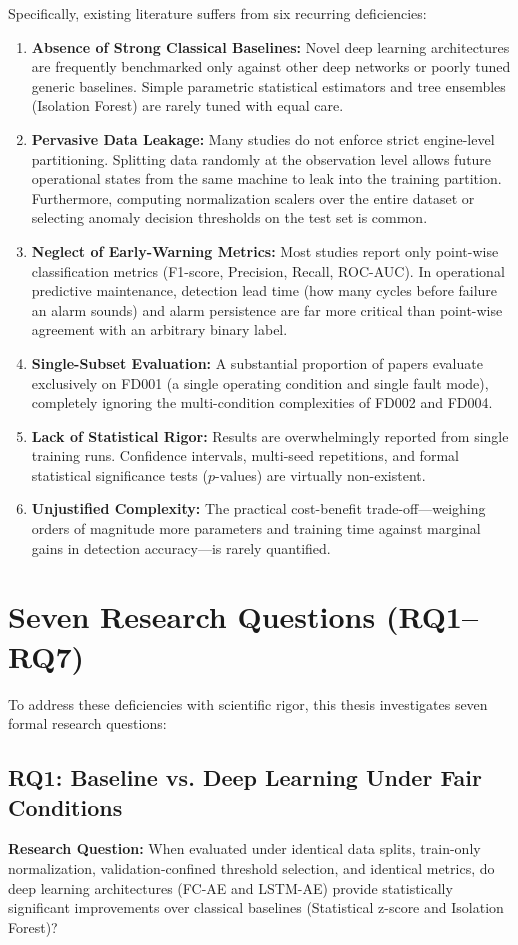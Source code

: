 \documentclass[12pt,a4paper,oneside]{report}
\begin{document}
Specifically, existing literature suffers from six recurring deficiencies:
\begin{enumerate}
    \item \textbf{Absence of Strong Classical Baselines:} Novel deep learning architectures are frequently benchmarked only against other deep networks or poorly tuned generic baselines. Simple parametric statistical estimators and tree ensembles (Isolation Forest) are rarely tuned with equal care.
    \item \textbf{Pervasive Data Leakage:} Many studies do not enforce strict engine-level partitioning. Splitting data randomly at the observation level allows future operational states from the same machine to leak into the training partition. Furthermore, computing normalization scalers over the entire dataset or selecting anomaly decision thresholds on the test set is common.
    \item \textbf{Neglect of Early-Warning Metrics:} Most studies report only point-wise classification metrics (F1-score, Precision, Recall, ROC-AUC). In operational predictive maintenance, detection lead time (how many cycles before failure an alarm sounds) and alarm persistence are far more critical than point-wise agreement with an arbitrary binary label.
    \item \textbf{Single-Subset Evaluation:} A substantial proportion of papers evaluate exclusively on FD001 (a single operating condition and single fault mode), completely ignoring the multi-condition complexities of FD002 and FD004.
    \item \textbf{Lack of Statistical Rigor:} Results are overwhelmingly reported from single training runs. Confidence intervals, multi-seed repetitions, and formal statistical significance tests ($p$-values) are virtually non-existent.
    \item \textbf{Unjustified Complexity:} The practical cost-benefit trade-off—weighing orders of magnitude more parameters and training time against marginal gains in detection accuracy—is rarely quantified.
\end{enumerate}

\section{Seven Research Questions (RQ1--RQ7)}
To address these deficiencies with scientific rigor, this thesis investigates seven formal research questions:

\subsection{RQ1: Baseline vs. Deep Learning Under Fair Conditions}
\textbf{Research Question:} When evaluated under identical data splits, train-only normalization, validation-confined threshold selection, and identical metrics, do deep learning architectures (FC-AE and LSTM-AE) provide statistically significant improvements over classical baselines (Statistical z-score and Isolation Forest)?
\end{document}
